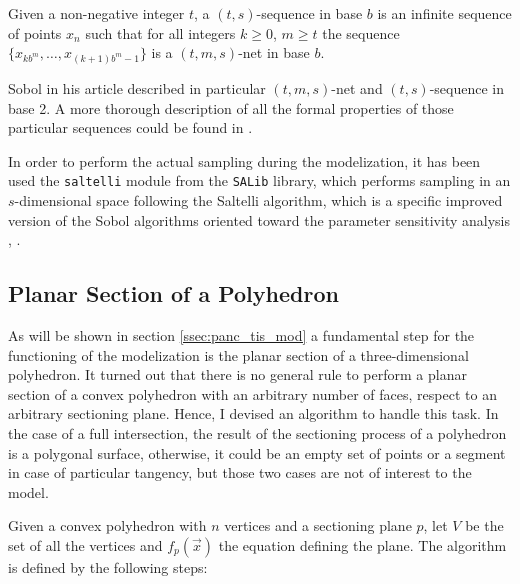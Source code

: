 Given a non-negative integer $t$, a $(t,s)$-sequence in base $b$ is an infinite sequence of points $x_n$ such that for all integers $k \geq 0$, $m \geq t$ the sequence $ \{ x_{kb^m}, \dots, x_{(k+1)b^m-1} \}$ is a $(t,m,s)$-net in base $b$.

Sobol in his article described in particular $(t,m,s)$-net and $(t,s)$-sequence in base 2. A more thorough description of all the formal properties of those particular sequences could be found in \cite{SOBOL1976236}.

In order to perform the actual sampling during the modelization, it has been used the \texttt{saltelli} module from the \texttt{SALib} library, which performs sampling in an $s$-dimensional space following the Saltelli algorithm, which is a specific improved version of the Sobol algorithms oriented toward the parameter sensitivity analysis \cite{SALTELLI2002280}, \cite{SALTELLI2010259}.


\subsection{Planar Section of a Polyhedron} \label{ssec:pol_sec}
As will be shown in section \ref{ssec:panc_tis_mod} a fundamental step for the functioning of the modelization is the planar section of a three-dimensional polyhedron. It turned out that there is no general rule to perform a planar section of a convex polyhedron with an arbitrary number of faces, respect to an arbitrary sectioning plane. Hence, I devised an algorithm to handle this task. In the case of a full intersection, the result of the sectioning process of a polyhedron is a polygonal surface, otherwise, it could be an empty set of points or a segment in case of particular tangency, but those two cases are not of interest to the model.

Given a convex polyhedron with $n$ vertices and a sectioning plane $p$, let $V$ be the set of all the vertices and $f_p(\vec x)$ the equation defining the plane. The algorithm is defined by the following steps:

